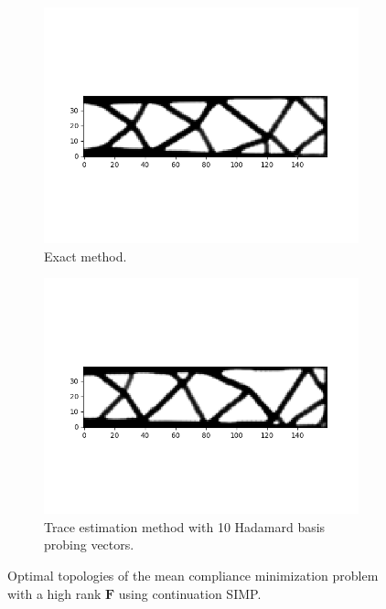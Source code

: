     \begin{figure}
      \begin{subfigure}[t]{0.9\textwidth}
        \centering
        \includegraphics[width=1\textwidth]{./images/robust_approx/results_2d_high_rank_figures/exact_svd_mean_csimp.png}
        \caption{Exact method.}
      \end{subfigure} \hfill
      \begin{subfigure}[t]{0.8\textwidth}
        \centering
        \includegraphics[width=1\textwidth]{./images/robust_approx/results_2d_high_rank_figures/trace_Hadamard10_mean_csimp.png}
        \caption{Trace estimation method with 10 Hadamard basis probing vectors.}
      \end{subfigure}
      \caption{Optimal topologies of the mean compliance minimization problem with a high rank $\bm{F}$ using continuation SIMP.}
      \label{fig:mean_high_rank}
    \end{figure}

